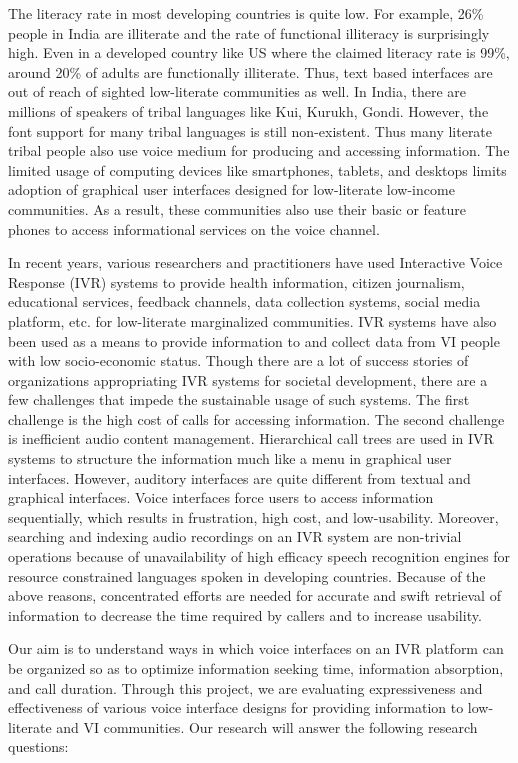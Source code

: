 \documentclass{sigchi}
\begin{document}
The literacy rate in most developing countries is quite low. For example, 26\% people in India are illiterate and the rate of functional illiteracy is surprisingly high. Even in a developed country like US where the claimed literacy rate is 99\%, around 20\% of adults are functionally illiterate. Thus, text based interfaces are out of reach of sighted low-literate communities as well. In India, there are millions of speakers of tribal languages like Kui, Kurukh, Gondi. However, the font support for many tribal languages is still non-existent. Thus many literate tribal people also use voice medium for producing and accessing information. The limited usage of computing devices like smartphones, tablets, and desktops limits adoption of graphical user interfaces designed for low-literate low-income communities. As a result, these communities also use their basic or feature phones to access informational services on the voice channel.

In recent years, various researchers and practitioners have used Interactive Voice Response (IVR) systems to provide health information, citizen journalism, educational services, feedback channels, data collection systems, social media platform, etc. for low-literate marginalized communities. IVR systems have also been used as a means to provide information to and collect data from VI people with low socio-economic status. Though there are a lot of success stories of organizations appropriating IVR systems for societal development, there are a few challenges that impede the sustainable usage of such systems. The first challenge is the high cost of calls for accessing information. The second challenge is inefficient audio content management. Hierarchical call trees are used in IVR systems to structure the information much like a menu in graphical user interfaces. However, auditory interfaces are quite different from textual and graphical interfaces. Voice interfaces force users to access information sequentially, which results in frustration, high cost, and low-usability. Moreover, searching and indexing audio recordings on an IVR system are non-trivial operations because of unavailability of high efficacy speech recognition engines for resource constrained languages spoken in developing countries. Because of the above reasons, concentrated efforts are needed for accurate and swift retrieval of information to decrease the time required by callers and to increase usability. 

Our aim is to understand ways in which voice interfaces on an IVR platform can be organized so as to optimize information seeking time, information absorption, and call duration. Through this project, we are evaluating expressiveness and effectiveness of various voice interface designs for providing information to low-literate and VI communities. Our research will answer the following research questions:
\end{document}
